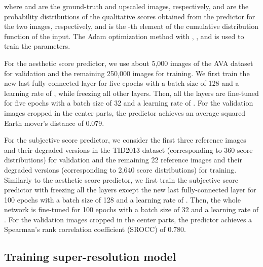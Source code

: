 \documentclass[runningheads]{llncs}
\begin{document}
where  and  are the ground-truth and upscaled images, respectively,  and  are the probability distributions of the qualitative scores obtained from the predictor for the two images, respectively, and  is the -th element of the cumulative distribution function of the input.
The Adam optimization method \cite{kingma2014adam} with , , and  is used to train the parameters.

For the aesthetic score predictor, we use about 5,000 images of the AVA dataset \cite{murray2012ava} for validation and the remaining 250,000 images for training.
We first train the new last fully-connected layer for five epochs with a batch size of 128 and a learning rate of , while freezing all other layers.
Then, all the layers are fine-tuned for five epochs with a batch size of 32 and a learning rate of .
For the validation images cropped in the center parts, the predictor achieves an average squared Earth mover's distance of 0.079. 

For the subjective score predictor, we consider the first three reference images and their degraded versions in the TID2013 dataset \cite{ponomarenko2015image} (corresponding to 360 score distributions) for validation and the remaining 22 reference images and their degraded versions (corresponding to 2,640 score distributions) for training.
Similarly to the aesthetic score predictor, we first train the subjective score predictor with freezing all the layers except the new last fully-connected layer for 100 epochs with a batch size of 128 and a learning rate of .
Then, the whole network is fine-tuned for 100 epochs with a batch size of 32 and a learning rate of .
For the validation images cropped in the center parts, the predictor achieves a Spearman's rank correlation coefficient (SROCC) of 0.780.

\subsection{Training super-resolution model}
\label{sec:training_perceptual_sr}
\end{document}
